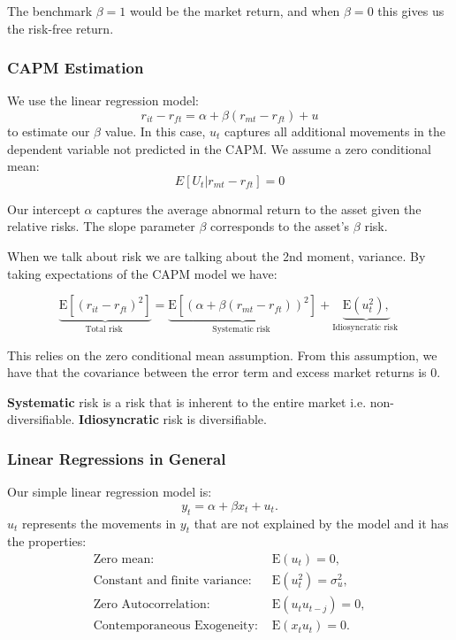 \documentclass[11pt]{article}
\begin{document}
The benchmark $\beta=1$ would be the market return, and when $\beta=0$ this gives us the risk-free return.

\subsubsection{CAPM Estimation}

We use the linear regression model:
\[r_{it} - r_{ft} = \alpha + \beta(r_{mt}-r_{ft}) + u\]
to estimate our $\beta$ value. In this case, $u_t$ captures all additional movements in the dependent variable not predicted in the CAPM. We assume a zero conditional mean:
\[E[U_t|r_{mt}-r_{ft}] = 0\]

Our intercept $\alpha$ captures the average abnormal return to the asset given the relative risks. The slope parameter $\beta$ corresponds to the asset's $\beta$ risk.

When we talk about risk we are talking about the 2nd moment, variance. By taking expectations of the CAPM model we have:

\begin{equation}
\underbrace{\mathrm{E}\left[\left(r_{i t}-r_{f t}\right)^2\right]}_{\text {Total risk }}=\underbrace{\mathrm{E}\left[\left(\alpha+\beta\left(r_{m t}-r_{f t}\right)\right)^2\right]}_{\text {Systematic risk }}+\underbrace{\mathrm{E}\left(u_t^2\right),}_{\text {Idiosyncratic risk }}
\end{equation}

This relies on the zero conditional mean assumption. From this assumption, we have that the covariance between the error term and excess market returns is 0.

\textbf{Systematic} risk is a risk that is inherent to the entire market i.e. non-diversifiable. \textbf{Idiosyncratic} risk is diversifiable.

\subsubsection{Linear Regressions in General}

Our simple linear regression model is:
\begin{equation}
y_t=\alpha+\beta x_t+u_t .
\end{equation}
$u_t$ represents the movements in $y_t$ that are not explained by the model and it has the properties:
\begin{equation}
\label{conditions of the error term}
\begin{aligned}
\text{Zero mean: } & \mathrm{E}\left(u_t\right)  =0, \\
\text{Constant and finite variance: }& \mathrm{E}\left(u_t^2\right) =\sigma_u^2, \\
\text{Zero Autocorrelation: }& \mathrm{E}\left(u_t u_{t-j}\right) =0, \\
\text{Contemporaneous Exogeneity: }& \mathrm{E}\left(x_t u_t\right) =0 .
\end{aligned}
\end{equation}
\end{document}

